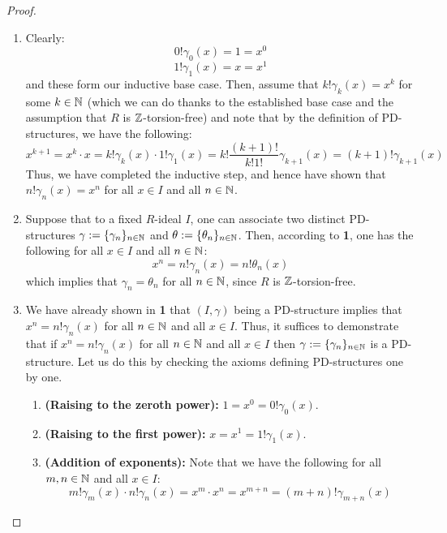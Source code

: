                     \begin{proof}
                        \noindent
                        \begin{enumerate}
                            \item Clearly:
                                $$0! \gamma_0(x) = 1 = x^0$$
                                $$1! \gamma_1(x) = x = x^1$$
                            and these form our inductive base case. Then, assume that $k! \gamma_k(x) = x^k$ for some $k \in \mathbb{N}$ (which we can do thanks to the established base case and the assumption that $R$ is $\mathbb{Z}$-torsion-free) and note that by the definition of PD-structures, we have the following:
                                $$x^{k + 1} = x^k \cdot x = k!\gamma_k(x) \cdot 1!\gamma_1(x) = k!\frac{(k + 1)!}{k! 1!} \gamma_{k + 1}(x) = (k + 1)!\gamma_{k + 1}(x)$$
                            Thus, we have completed the inductive step, and hence have shown that $n!\gamma_n(x) = x^n$ for all $x \in I$ and all $n \in \mathbb{N}$.
                            \item Suppose that to a fixed $R$-ideal $I$, one can associate two distinct PD-structures $\gamma := \{\gamma_n\}_{n \in \mathbb{N}}$ and $\theta := \{\theta_n\}_{n \in \mathbb{N}}$. Then, according to \textbf{1}, one has the following for all $x \in I$ and all $n \in \mathbb{N}$:
                                $$x^n = n!\gamma_n(x) = n!\theta_n(x)$$
                            which implies that $\gamma_n = \theta_n$ for all $n \in \mathbb{N}$, since $R$ is $\mathbb{Z}$-torsion-free.
                            \item We have already shown in \textbf{1} that $(I, \gamma)$ being a PD-structure implies that $x^n = n!\gamma_n(x)$ for all $n \in \mathbb{N}$ and all $x \in I$. Thus, it suffices to demonstrate that if $x^n = n!\gamma_n(x)$ for all $n \in \mathbb{N}$ and all $x \in I$ then $\gamma := \{\gamma_n\}_{n \in \mathbb{N}}$ is a PD-structure. Let us do this by checking the axioms defining PD-structures one by one.
                                \begin{enumerate}
                                    \item \textbf{(Raising to the zeroth power):} $1 = x^0 = 0! \gamma_0(x)$.
                                    \item \textbf{(Raising to the first power):} $x = x^1 = 1! \gamma_1(x)$.
                                    \item \textbf{(Addition of exponents):} Note that we have the following for all $m, n \in \mathbb{N}$ and all $x \in I$:
                                        $$m!\gamma_m(x) \cdot n!\gamma_n(x) = x^m \cdot x^n = x^{m + n} = (m + n)!\gamma_{m + n}(x)$$

\end{enumerate}
\end{enumerate}
\end{proof}
